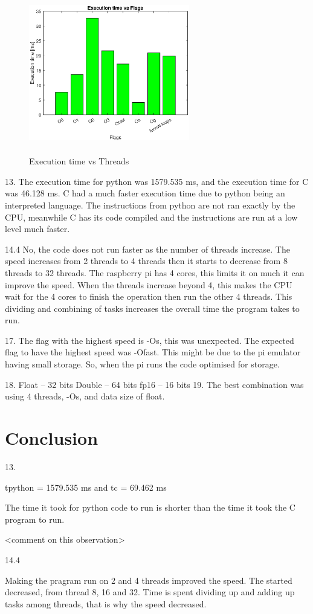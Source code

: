 \documentclass[twocolumn]{article}
\begin{document}
\begin{figure}[!h]

    \centering

    \includegraphics[width = 7cm, height = 7cm]{graph2}

    \caption{Execution time vs Threads}

\end{figure}

13. The execution time for python was 1579.535 ms, and the execution time for C was 46.128 ms. C had a much faster execution time due to python being an interpreted language. The instructions from python are not ran exactly by the CPU, meanwhile C has its code compiled and the instructions are run at a low level much faster.

14.4 No, the code does not run faster as the number of threads increase. The speed increases from 2 threads to 4 threads then it starts to decrease from 8 threads to 32 threads. The raspberry pi has 4 cores, this limits it on much it can improve the speed. When the threads increase beyond 4, this makes the CPU wait for the 4 cores to finish the operation then run the other 4 threads. This dividing and combining of tasks increases the overall time the program takes to run.

17. The flag with the highest speed is -Os, this was unexpected. The expected flag to have the highest speed was -Ofast. This might be due to the pi emulator having small storage. So, when the pi runs the code optimised for storage. 

18. 
Float – 32 bits
Double – 64 bits
fp16 – 16 bits
19. 
The best combination was using 4 threads, -Os, and data size of float. 

\section{Conclusion}

13.
 
tpython = 1579.535 ms and tc = 69.462 ms

The time it took for python code to run is shorter than the time it took the C program to run.

 <comment on this observation>

14.4

Making the pragram run on 2 and 4 threads improved the speed. The started decreased, from thread 8, 16 and 32. Time is spent dividing up and adding up tasks among threads, that is why the speed decreased.
\end{document}
